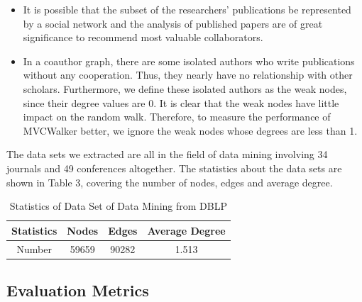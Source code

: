 \documentclass[10pt,journal,compsoc]{IEEEtran}
\begin{document}
\begin{itemize}
\item It is possible that the subset of the researchers' publications be represented by a social network \cite{Brandao:using} and the analysis of published papers are of great significance to recommend most valuable collaborators.
\item In a coauthor graph, there are some isolated authors who write publications without any cooperation. Thus, they nearly have no relationship with other scholars. Furthermore, we define these isolated authors as the weak nodes, since their degree values are 0. It is clear that the weak nodes have little impact on the random walk. Therefore, to measure the performance of MVCWalker better, we ignore the weak nodes whose degrees are less than 1.
\end{itemize}

The data sets we extracted are all in the field of data mining involving 34 journals and 49 conferences altogether. The statistics about the data sets are shown in Table 3, covering the number of nodes, edges and average degree.
\begin{table}
\renewcommand{\arraystretch}{1.2}
\centering
\caption{Statistics of Data Set of Data Mining from DBLP}
\begin{tabular}{|c|c|c|c|} \hline
Statistics &Nodes&Edges&Average Degree\\ \hline
Number & 59659 &90282 &1.513 \\
\hline\end{tabular}
\end{table}

\subsection{Evaluation Metrics}
\end{document}
